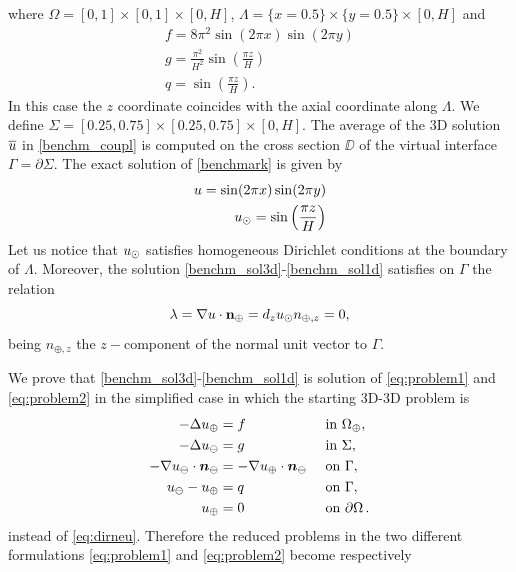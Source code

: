 \documentclass[r]{siamart171218}
\begin{document}
where $\Omega=[0,1]\times [0,1]\times [0,H]$, $\Lambda=\{x=0.5\}\times \{y=0.5\} \times [0,H] $ and
\begin{eqnarray*}
f=8\pi ^2 \sin (2\pi x) \sin (2\pi y)\\
g=\frac{\pi ^2}{H^2} \sin \left(\frac{\pi z}{H}\right)\\
q=\sin \left(\frac{\pi z}{H}\right).
\end{eqnarray*}
In this case the $z$ coordinate coincides with the axial coordinate along $\Lambda$. We define $\Sigma=[0.25,0.75]\times [0.25,0.75]\times [0,H]$. The average of the 3D solution $\overline{u}$ in \eqref{benchm_coupl} is computed on the cross section $\DD$ of the virtual interface $\Gamma=\partial \Sigma$. The exact solution of \eqref{benchmark} is given by
\begin{eqnarray}
\label{benchm_sol3d}
u=\sin (2\pi x) \sin (2\pi y)\\
\label{benchm_sol1d}
\ud=\sin \left(\frac{\pi z}{H}\right) 
\end{eqnarray}
Let us notice that $u_{\odot}$ satisfies homogeneous Dirichlet conditions at the boundary of $\Lambda$.
Moreover, the solution \eqref{benchm_sol3d}-\eqref{benchm_sol1d} satisfies on $\Gamma$ the relation
\begin{equation}\label{benchm_flux}
\lambda=\nabla u \cdot \textbf{n}_{\oplus}=d_z \ud n_{\oplus,z}=0,
\end{equation}
being $n_{\oplus,z}$ the $z-$component of the normal unit vector to $\Gamma$.

We prove that \eqref{benchm_sol3d}-\eqref{benchm_sol1d} is solution of \eqref{eq:problem1} and \eqref{eq:problem2} in the simplified case in which the starting 3D-3D problem is
\begin{subequations}\label{eq:dirneu_simple}
\begin{align}
- \Delta u_{\oplus}  &= f  && \text{ in } \Omega_{\oplus},\\
- \Delta u_{\ominus} &= g  && \text{ in } \Sigma,\\
-\nabla u_{\ominus} \cdot \boldsymbol n_{\ominus} &= -\nabla u_{\oplus} \cdot \boldsymbol n_{\ominus}  && \text{ on } \Gamma,\\
u_{\ominus} - u_{\oplus} &= q  && \text{ on }  \Gamma,\\
u_{\oplus} &= 0 && \text{ on } \partial \Omega\,.
\end{align}
\end{subequations}
instead of \eqref{eq:dirneu}. Therefore the reduced problems in the two different formulations \eqref{eq:problem1} and \eqref{eq:problem2} become respectively
 
\end{document}
